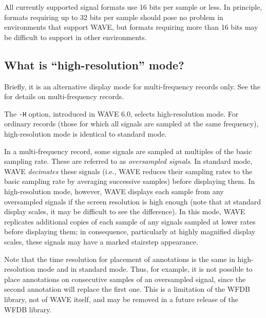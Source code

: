 \documentclass[twoside]{book}
\newcommand{\WAVE}{{\sf WAVE}\xspace}
\begin{document}
All currently supported signal formats use 16 bits per sample or less.
In principle, formats requiring up to 32 bits per sample should pose
no problem in environments that support \WAVE{}, but formats requiring
more than 16 bits may be difficult to support in other environments.

\subsection{What is ``high-resolution'' mode?}

\label{faq:high-res}
Briefly, it is an alternative display mode for multi-frequency records
only.  See the
for details on multi-frequency records.

\index{H option for WAVE@{\tt -H} option for \WAVE{}}
The {\tt -H} option, introduced in \WAVE{} 6.0, selects
high-resolution mode.  For ordinary records (those for which all
signals are sampled at the same frequency), high-resolution mode is
identical to standard mode.

In a multi-frequency record, some signals are sampled at multiples of
the basic sampling rate.  These are referred to as \emph{oversampled
signals}.  In standard mode, \WAVE{} \emph{decimates} these signals
(i.e., \WAVE{} reduces their sampling rates to the basic sampling rate
by averaging successive samples) before displaying them.  In
high-resolution mode, however, \WAVE{} displays each sample from any
oversampled signals if the screen resolution is high enough (note that
at standard display scales, it may be difficult to see the
difference).  In this mode, \WAVE{} replicates additional copies of
each sample of any signals sampled at lower rates before displaying
them; in consequence, particularly at highly magnified display scales,
these signals may have a marked stairstep appearance.

Note that the time resolution for placement of annotations is the same
in high-resolution mode and in standard mode.  Thus, for example, it
is not possible to place annotations on consecutive samples of an
oversampled signal, since the second annotation will replace the first
one.  This is a limitation of the WFDB library, not of \WAVE{} itself,
and may be removed in a future release of the WFDB library.
\end{document}
